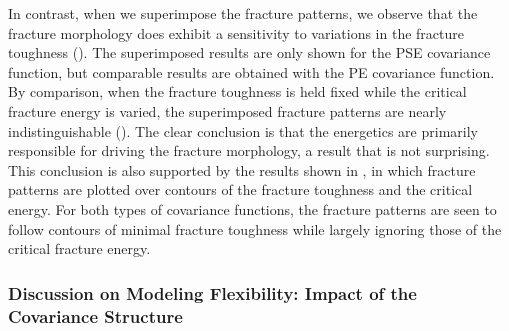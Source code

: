 

In contrast, when we superimpose the fracture patterns, we observe that the fracture morphology does exhibit a sensitivity to variations in the fracture toughness  (). The superimposed results are only shown for the PSE covariance function, but comparable results are obtained with the PE covariance function.
By comparison, when the fracture toughness is held fixed while the critical fracture energy is varied, the superimposed fracture patterns are nearly indistinguishable (). The clear conclusion is that the energetics are primarily responsible for driving the fracture morphology, a result that is not surprising. This conclusion is also supported by the results shown in , in which fracture patterns are plotted over contours of the fracture toughness and the critical energy. For both types of covariance functions, the fracture patterns are seen to follow contours of minimal fracture toughness while largely ignoring those of the critical fracture energy.





\subsubsection{Discussion on Modeling Flexibility: Impact of the Covariance Structure}

